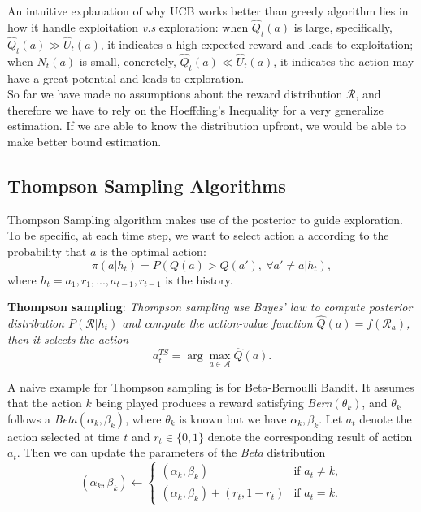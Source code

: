 \documentclass{progartcn}
\begin{document}
        	An intuitive explanation of why UCB works better than greedy algorithm lies in how it handle exploitation \textit{v.s} exploration: when $\hat{Q}_t(a)$ is large, specifically, $\hat{Q}_t(a)\gg \hat{U}_t(a)$, it indicates a high expected reward and leads to exploitation; when $N_t(a)$ is small, concretely, $\hat{Q}_t(a)\ll \hat{U}_t(a)$, it indicates the action may have a great potential and leads to exploration.\\

        	So far we have made no assumptions about the reward distribution $\mathcal{R}$, and therefore we have to rely on the Hoeffding's Inequality for a very generalize estimation. If we are able to know the distribution upfront, we would be able to make better bound estimation.

    \subsection{Thompson Sampling Algorithms}

        	Thompson Sampling algorithm makes use of the posterior to guide exploration. To be specific, at each time step, we want to select action a according to the probability that $a$ is the optimal action:
        	\[\pi(a|h_t)=P(Q(a)>Q(a'),\ \forall a'\ne a|h_t),\]
        	where $h_t=a_1,r_1,...,a_{t-1},r_{t-1}$ is the history.

        	\textbf{Thompson sampling}: \textit{Thompson sampling use Bayes' law to compute posterior distribution $P(\mathcal{R}|h_t)$ and compute the action-value function $\hat{Q}(a)=f(\mathcal{R}_a)$, then it selects the action}
        	\[a_t^{TS}=\arg\max_{a\in \mathcal{A}} \hat{Q}(a).\]

        	A naive example for Thompson sampling is for Beta-Bernoulli Bandit. It assumes that the action $k$ being played produces a reward satisfying \textit{Bern}$(\theta_k)$, and $\theta_k$ follows a \textit{Beta}$(\alpha_k,\beta_k)$, where $\theta_k$ is known but we have $\alpha_k,\beta_k$. Let $a_t$ denote the action selected at time $t$ and $r_t\in\{0,1\}$ denote the corresponding result of action $a_t$. Then we can update the parameters of the \textit{Beta} distribution
        	\[(\alpha_k,\beta_k)\gets\begin{cases}(\alpha_k,\beta_k) &\text{if } a_t\ne k,\\ (\alpha_k,\beta_k)+(r_t,1-r_t) &\text{if } a_t=k.\end{cases}\]
\end{document}
